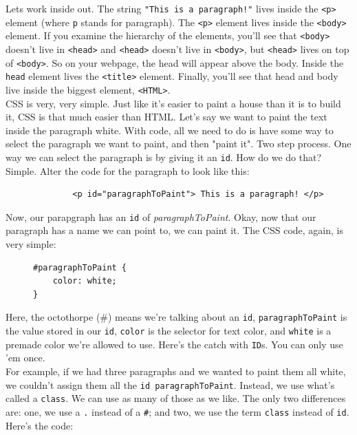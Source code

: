 \documentclass[12pt, letterpaper]{article}
\begin{document}
Lets work inside out. The string \verb+"This is a paragraph!"+ lives inside the \verb+<p>+ element (where \verb+p+
stands for paragraph). The \verb+<p>+ element lives inside the \verb+<body>+ element. If you examine the hierarchy
of the elements, you'll see that \verb+<body>+ doesn't live in \verb+<head>+ and \verb+<head>+ doesn't live in \verb+<body>+, but 
\verb+<head>+ lives on top of \verb+<body>+. So on your webpage, the head will appear above the body. Inside the \verb+head+ element lives the 
\verb+<title>+ element. Finally, you'll see that head and body live inside the biggest element, \verb+<HTML>+. \\

CSS is very, very simple. Just like it's easier to paint a house than it is to build it, CSS is that much easier than
HTML. Let's say we want to paint the text inside the paragraph white. With code, all we need to do is have some way
to select the paragraph we want to paint, and then "paint it". Two step process. One way we can select the paragraph is
by giving it an \verb+id+. How do we do that? Simple. Alter the code for the paragraph to look like this: \\

\begin{figure}[ht]
\centering
\begin{BVerbatim}
        <p id="paragraphToPaint"> This is a paragraph! </p>
\end{BVerbatim}
\end{figure}

Now, our parapgraph has an \verb+id+ of \emph{paragraphToPaint}. Okay, now that our paragraph has a name we can point to,
we can paint it. The CSS code, again, is very simple: \\

\begin{figure}[ht]
\centering
\begin{BVerbatim}
#paragraphToPaint {
    color: white;
}
\end{BVerbatim}
\end{figure}

Here, the octothorpe (\#) means we're talking about an \verb+id+, \verb+paragraphToPaint+ is the value stored in our
\verb+id+, \verb+color+ is the selector for text color, and \verb+white+ is a premade color we're allowed to use. Here's the 
catch with \verb+ID+s. You can only use 'em once. \\

For example, if we had three paragraphs and we wanted to paint them
all white, we couldn't assign them all the \verb+id paragraphToPaint+. Instead, we use what's called a \verb+class+.
We can use as many of those as we like. The only two differences are: one, we use a \verb+.+ instead of a \verb+#+; 
and two, we use the term \verb+class+ instead of \verb+id+. Here's the code:
\end{document}
